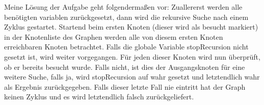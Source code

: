 \documentclass[11pt]{scrartcl}
\begin{document}
Meine Lösung der Aufgabe geht folgendermaßen vor: Zuallererst werden alle benötigten variablen zurückgesetzt, dann wird die rekursive Suche nach einem Zyklus gestartet. Startend beim ersten Knoten (dieser wird als besucht markiert) in der Knotenliste des Graphen werden alle von diesem ersten Knoten erreichbaren Knoten betrachtet. Falls die globale Variable stopRecursion nicht gesetzt ist, wird weiter vorgegangen. Für jeden dieser Knoten wird nun überprüft, ob er bereits besucht wurde. Falls nicht, ist dies der Ausgangsknoten für eine weitere Suche, falls ja, wird stopRecursion auf wahr gesetzt und letztendlich wahr als Ergebnis zurückgegeben. Falls dieser letzte Fall nie eintritt hat der Graph keinen Zyklus und es wird letztendlich falsch zurückgeliefert.
 
\end{document}
